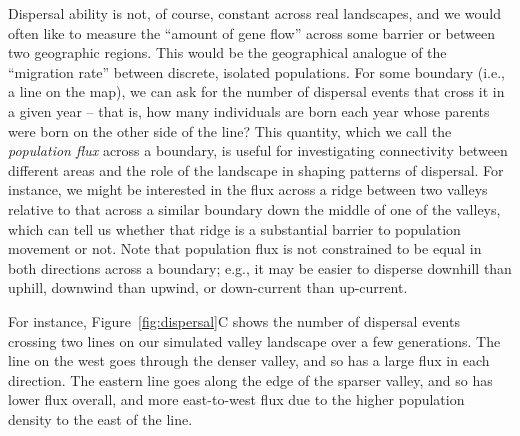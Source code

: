 \documentclass{ar-1col}
\begin{document}
Dispersal ability is not, of course, constant across real landscapes, and
we would often like to measure the ``amount of gene flow'' across some barrier
or between two geographic regions.
This would be the geographical analogue of
the ``migration rate'' between discrete, isolated populations.
For some boundary (i.e., a line on the map),
we can ask for the number of dispersal events that cross it in a given year -- 
that is, 
how many individuals are born each year whose parents
were born on the other side of the line?
This quantity, which we call the \textit{population flux} across a boundary,
is useful for investigating connectivity between different areas
and the role of the landscape in shaping patterns of dispersal.
For instance,
we might be interested in the flux across a ridge between two valleys
relative to that across a similar boundary down the middle of one of the valleys,
which can tell us whether that ridge is a substantial barrier to population movement or not.
Note that population flux is not constrained to be equal in both directions across a boundary;
e.g., it may be easier to disperse downhill than uphill,
downwind than upwind,
or down-current than up-current.

For instance, Figure~\ref{fig:dispersal}C
shows the number of dispersal events crossing two lines on our simulated valley landscape
over a few generations.
The line on the west goes through the denser valley, 
and so has a large flux in each direction.
The eastern line goes along the edge of the sparser valley,
and so has lower flux overall, and more east-to-west flux
due to the higher population density to the east of the line.
\end{document}
